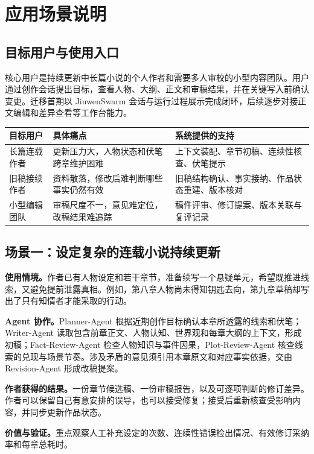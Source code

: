 \section{应用场景说明}

\subsection{目标用户与使用入口}

核心用户是持续更新中长篇小说的个人作者和需要多人审校的小型内容团队。用户通过创作会话提出目标，查看人物、大纲、正文和审稿结果，并在关键写入前确认变更。迁移首期以 JiuwenSwarm 会话与运行过程展示完成闭环，后续逐步对接正文编辑和差异查看等工作台能力。

\noindent\begin{tabularx}{\textwidth}{@{}p{}YY@{}}
\toprule
目标用户 & 具体痛点 & 系统提供的支持 \\
\midrule
长篇连载作者 & 更新压力大，人物状态和伏笔跨章维护困难 & 上下文装配、章节初稿、连续性核查、伏笔提示 \\
旧稿接续作者 & 资料散落，修改后难判断哪些事实仍然有效 & 旧稿结构确认、事实接纳、作品状态重建、版本核对 \\
小型编辑团队 & 审稿尺度不一，意见难定位，改稿结果难追踪 & 稿件评审、修订提案、版本关联与复评记录 \\
\bottomrule
\end{tabularx}

\subsection{场景一：设定复杂的连载小说持续更新}

\textbf{使用情境。}作者已有人物设定和若干章节，准备续写一个悬疑单元，希望既推进线索，又避免提前泄露真相。例如，第八章人物尚未得知钥匙去向，第九章草稿却写出了只有知情者才能采取的行动。

\textbf{Agent 协作。}Planner-Agent 根据近期创作目标确认本章所透露的线索和伏笔；Writer-Agent 读取包含前章正文、人物认知、世界观和每章大纲的上下文，形成初稿；Fact-Review-Agent 检查人物知识与事件因果，Plot-Review-Agent 核查线索的兑现与场景节奏。涉及矛盾的意见须引用本章原文和对应事实依据，交由 Revision-Agent 形成改稿提案。

\textbf{作者获得的结果。}一份章节候选稿、一份审稿报告，以及可逐项判断的修订差异。作者可以保留自己有意安排的误导，也可以接受修复；接受后重新核查受影响内容，并同步更新作品状态。

\textbf{价值与验证。}重点观察人工补充设定的次数、连续性错误检出情况、有效修订采纳率和每章总耗时。

